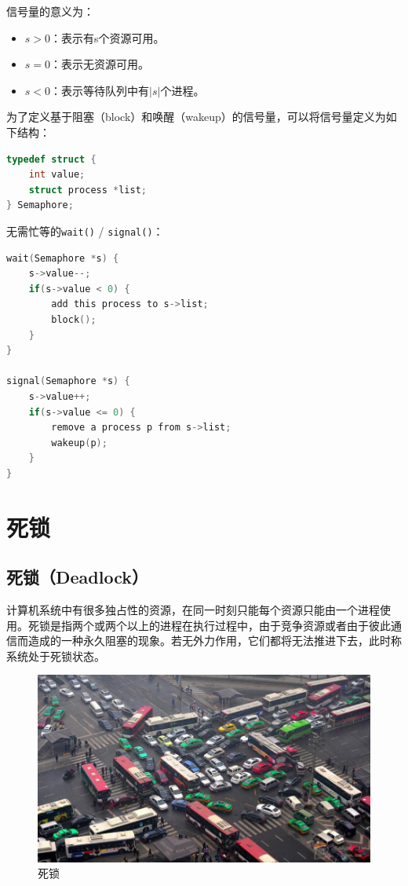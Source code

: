 信号量的意义为：

\begin{itemize}
	\item $ s > 0 $：表示有s个资源可用。
	\item $ s = 0 $：表示无资源可用。
	\item $ s < 0 $：表示等待队列中有$ |s| $个进程。
\end{itemize}

为了定义基于阻塞（block）和唤醒（wakeup）的信号量，可以将信号量定义为如下结构：

\begin{lstlisting}[language=C]
typedef struct {
	int value;
	struct process *list;
} Semaphore;
\end{lstlisting}

无需忙等的\lstinline|wait()| / \lstinline|signal()|：

\begin{lstlisting}[language=C]
wait(Semaphore *s) {
	s->value--;
	if(s->value < 0) {
		add this process to s->list;
		block();
	}
}

signal(Semaphore *s) {
	s->value++;
	if(s->value <= 0) {
		remove a process p from s->list;
		wakeup(p);
	}
}
\end{lstlisting}

\newpage

\section{死锁}

\subsection{死锁（Deadlock）}

计算机系统中有很多独占性的资源，在同一时刻只能每个资源只能由一个进程使用。死锁是指两个或两个以上的进程在执行过程中，由于竞争资源或者由于彼此通信而造成的一种永久阻塞的现象。若无外力作用，它们都将无法推进下去，此时称系统处于死锁状态。

\begin{figure}[H]
	\centering
	\includegraphics[]{img/C2/2-8/1.png}
	\caption{死锁}
\end{figure}

